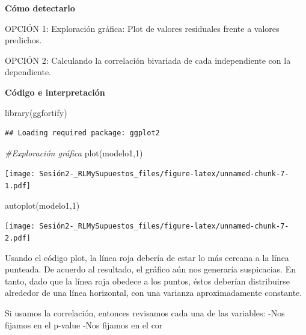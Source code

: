 \documentclass[
]{article}
\newenvironment{Shaded}{\begin{snugshade}}{\end{snugshade}}
\newcommand{\CommentTok}[1]{\textcolor[rgb]{0.56,0.35,0.01}{\textit{#1}}}
\newcommand{\DecValTok}[1]{\textcolor[rgb]{0.00,0.00,0.81}{#1}}
\newcommand{\FunctionTok}[1]{\textcolor[rgb]{0.00,0.00,0.00}{#1}}
\newcommand{\NormalTok}[1]{#1}
\newcommand{\SpecialCharTok}[1]{\textcolor[rgb]{0.00,0.00,0.00}{#1}}
\begin{document}
\textbf{Cómo detectarlo}

OPCIÓN 1: Exploración gráfica: Plot de valores residuales frente a
valores predichos.

OPCIÓN 2: Calculando la correlación bivariada de cada independiente con
la dependiente.

\textbf{Código e interpretación}

\begin{Shaded}
\begin{Highlighting}[]
\FunctionTok{library}\NormalTok{(ggfortify)}
\end{Highlighting}
\end{Shaded}

\begin{verbatim}
## Loading required package: ggplot2
\end{verbatim}

\begin{Shaded}
\begin{Highlighting}[]
\CommentTok{\#Exploración gráfica}
\FunctionTok{plot}\NormalTok{(modelo1,}\DecValTok{1}\NormalTok{)}
\end{Highlighting}
\end{Shaded}

\texttt{[image: Sesión2-\_RLMySupuestos\_files/figure-latex/unnamed-chunk-7-1.pdf]}

\begin{Shaded}
\begin{Highlighting}[]
\FunctionTok{autoplot}\NormalTok{(modelo1,}\DecValTok{1}\NormalTok{)}
\end{Highlighting}
\end{Shaded}

\texttt{[image: Sesión2-\_RLMySupuestos\_files/figure-latex/unnamed-chunk-7-2.pdf]}

Usando el código plot, la línea roja debería de estar lo más cercana a
la línea punteada. De acuerdo al resultado, el gráfico aún nos generaría
suspicacias. En tanto, dado que la línea roja obedece a los puntos,
éstos deberían distribuirse alrededor de una línea horizontal, con una
varianza aproximadamente constante.

Si usamos la correlación, entonces revisamos cada una de las variables:
-Nos fijamos en el p-value -Nos fijamos en el cor

\begin{Shaded}
\end{Shaded}
\end{document}
